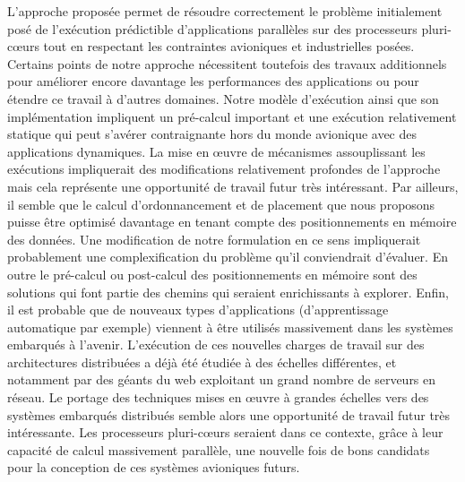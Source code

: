 \documentclass[main.tex]{subfiles}
\begin{document}
L'approche proposée permet de résoudre correctement le problème initialement posé de l'exécution prédictible d'applications parallèles sur des processeurs pluri-c\oe{}urs tout en respectant les contraintes avioniques et industrielles posées. Certains points de notre approche nécessitent toutefois des travaux additionnels pour améliorer encore davantage les performances des applications ou pour étendre ce travail à d'autres domaines.
Notre modèle d'exécution ainsi que son implémentation impliquent un pré-calcul important et une exécution relativement statique qui peut s'avérer contraignante hors du monde avionique avec des applications dynamiques. La mise en \oe{}uvre de mécanismes assouplissant les exécutions impliquerait des modifications relativement profondes de l'approche mais cela représente une opportunité de travail futur très intéressant. Par ailleurs, il semble que le calcul d'ordonnancement et de placement que nous proposons puisse être optimisé davantage en tenant compte des positionnements en mémoire des données. Une modification de notre formulation en ce sens impliquerait probablement une complexification du problème qu'il conviendrait d'évaluer. En outre le pré-calcul ou post-calcul des positionnements en mémoire sont des solutions qui font partie des chemins qui seraient enrichissants à explorer. Enfin, il est probable que de nouveaux types d'applications (d'apprentissage automatique par exemple) viennent à être utilisés massivement dans les systèmes embarqués à l'avenir. L'exécution de ces nouvelles charges de travail sur des architectures distribuées a déjà été étudiée à des échelles différentes, et notamment par des géants du web exploitant un grand nombre de serveurs en réseau. Le portage des techniques mises en \oe{}uvre à grandes échelles vers des systèmes embarqués distribués semble alors une opportunité de travail futur très intéressante. Les processeurs pluri-c\oe{}urs seraient dans ce contexte, grâce à leur capacité de calcul massivement parallèle, une nouvelle fois de bons candidats pour la conception de ces systèmes avioniques futurs.

\clearpage

\subbiblio
\end{document}
